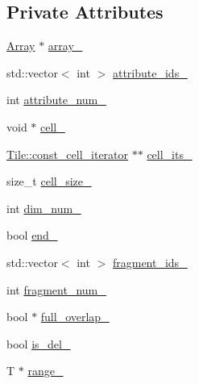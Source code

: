 \subsection*{Private Attributes}
\begin{DoxyCompactItemize}
\item 
\hyperlink{classStorageManager_1_1Array}{Array} $\ast$ \hyperlink{classStorageManager_1_1Array_1_1const__cell__iterator_a81bf56fca9b42c1233897c91cb5ba662}{array\+\_\+}
\item 
std\+::vector$<$ int $>$ \hyperlink{classStorageManager_1_1Array_1_1const__cell__iterator_a47b3d4749dc0b4b19d817d50eb2b48b4}{attribute\+\_\+ids\+\_\+}
\item 
int \hyperlink{classStorageManager_1_1Array_1_1const__cell__iterator_a42078a9fb956c03a3ea3c6842addf5a7}{attribute\+\_\+num\+\_\+}
\item 
void $\ast$ \hyperlink{classStorageManager_1_1Array_1_1const__cell__iterator_ac0664d62642d1820e16472737f774aa3}{cell\+\_\+}
\item 
\hyperlink{classTile_1_1const__cell__iterator}{Tile\+::const\+\_\+cell\+\_\+iterator} $\ast$$\ast$ \hyperlink{classStorageManager_1_1Array_1_1const__cell__iterator_a0228a45b393260191faf74ab8de97e59}{cell\+\_\+its\+\_\+}
\item 
size\+\_\+t \hyperlink{classStorageManager_1_1Array_1_1const__cell__iterator_afc2fc05f7c8c7eee43136fb7d2a4450b}{cell\+\_\+size\+\_\+}
\item 
int \hyperlink{classStorageManager_1_1Array_1_1const__cell__iterator_a667e0b16e1df5524fc65f7966d1bc0ba}{dim\+\_\+num\+\_\+}
\item 
bool \hyperlink{classStorageManager_1_1Array_1_1const__cell__iterator_a3d1517432b22c3446c135510b037ff77}{end\+\_\+}
\item 
std\+::vector$<$ int $>$ \hyperlink{classStorageManager_1_1Array_1_1const__cell__iterator_a2cb5d8b4e215896fdd712bc7c263700a}{fragment\+\_\+ids\+\_\+}
\item 
int \hyperlink{classStorageManager_1_1Array_1_1const__cell__iterator_a427240a3325532c64c2358b5bded512e}{fragment\+\_\+num\+\_\+}
\item 
bool $\ast$ \hyperlink{classStorageManager_1_1Array_1_1const__cell__iterator_a4cf4a6d25e09117726019623b8e752ba}{full\+\_\+overlap\+\_\+}
\item 
bool \hyperlink{classStorageManager_1_1Array_1_1const__cell__iterator_aa43e8557cafb358276994ea6bbd89bd1}{is\+\_\+del\+\_\+}
\item 
T $\ast$ \hyperlink{classStorageManager_1_1Array_1_1const__cell__iterator_abe48759f70358627df97e3aaec3fe8fd}{range\+\_\+}
$$
\end{DoxyCompactItemize}
